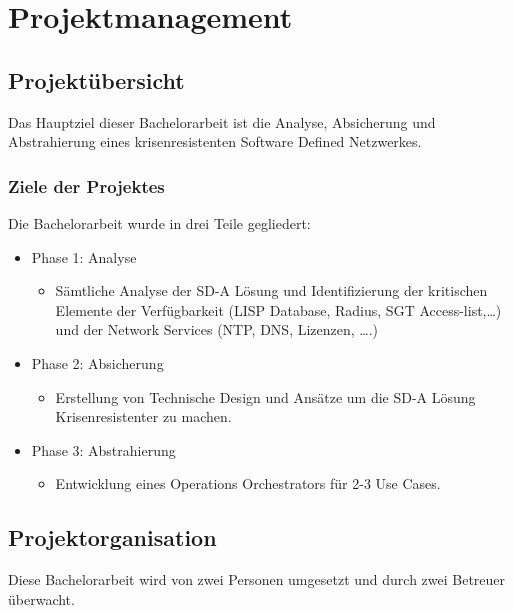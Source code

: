 \section{Projektmanagement}

\subsection{Projektübersicht}
Das Hauptziel dieser Bachelorarbeit ist die Analyse, Absicherung und Abstrahierung eines krisenresistenten Software Defined Netzwerkes.

\subsubsection{Ziele der Projektes}
Die Bachelorarbeit wurde in drei Teile gegliedert:
\begin{itemize}
	\item Phase 1: Analyse
	\begin{itemize}
		\item Sämtliche Analyse der SD-A Lösung und Identifizierung der kritischen Elemente der Verfügbarkeit (LISP Database, Radius, SGT Access-list,…) und der Network Services (NTP, DNS, Lizenzen, ….)
	\end{itemize}
	\item Phase 2: Absicherung
	\begin{itemize}
		\item Erstellung von Technische Design und Ansätze um die SD-A Lösung Krisenresistenter zu machen.
	\end{itemize}
	\item Phase 3: Abstrahierung
	\begin{itemize}
		\item Entwicklung eines Operations Orchestrators für 2-3 Use Cases.
	\end{itemize}
	
\end{itemize}

\subsection{Projektorganisation}
Diese Bachelorarbeit wird von zwei Personen umgesetzt und durch zwei Betreuer überwacht.

